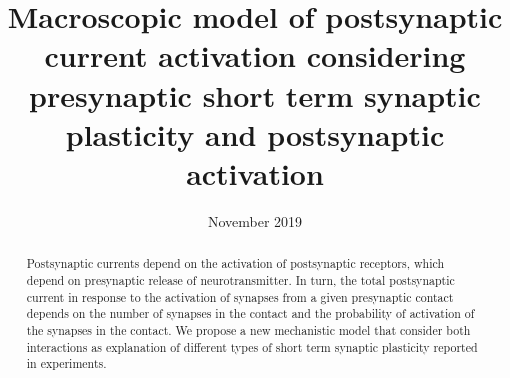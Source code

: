 \documentclass{article}
\title{Macroscopic model of postsynaptic current activation considering presynaptic short term synaptic plasticity and postsynaptic activation}
\date{November 2019}
\begin{document}
\maketitle


\begin{abstract}
    Postsynaptic currents depend on the activation of postsynaptic receptors, which depend on presynaptic release of neurotransmitter. In turn, the total postsynaptic current in response to the activation of synapses from a given presynaptic contact depends on the number of synapses in the contact and the probability of activation of the synapses in the contact. We propose a new mechanistic model that consider both interactions as  explanation of different types of short term synaptic plasticity reported in experiments.
    
    
\end{abstract}

\newpage

\tableofcontents
\newpage




%
\newpage




\newpage




\end{document}
